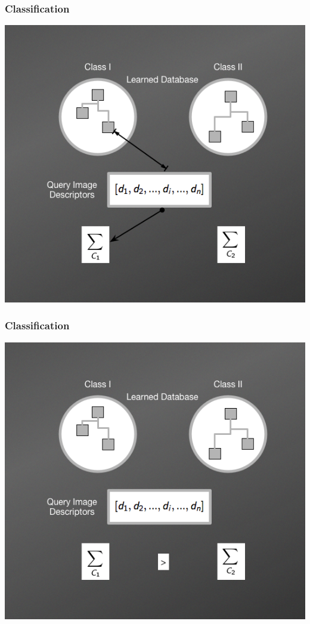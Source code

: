 \documentclass[11pt]{beamer}
\begin{document}
    \begin{frame}
        \frametitle{Classification}
        \begin{center}
            \item \includegraphics[scale=0.38]{img/NBNNMethod3.png}    
        \end{center}
    \end{frame}    

    \begin{frame}
        \frametitle{Classification}
        \begin{center}
            \item \includegraphics[scale=0.38]{img/NBNNMethod4.png}     
        \end{center}
    \end{frame}    
    
\end{document}

